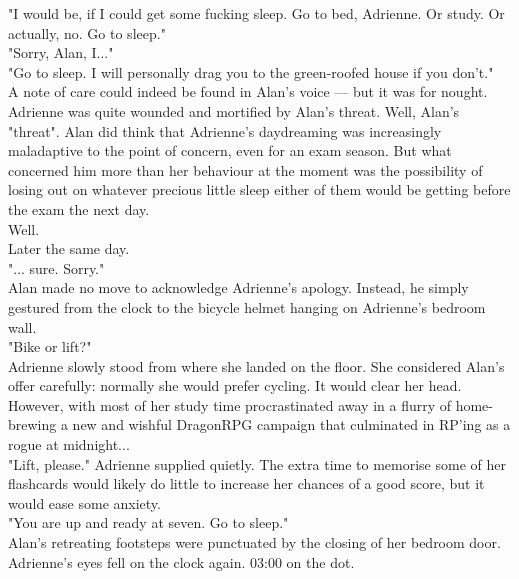 "I would be, if I could get some fucking sleep. Go to bed, Adrienne. Or study. Or actually, no. Go to sleep."\\

"Sorry, Alan, I..."\\

"Go to sleep. I will personally drag you to the green-roofed house if you don't."\\

A note of care could indeed be found in Alan's voice --- but it was for nought. Adrienne was quite wounded and mortified by Alan's threat.
Well, Alan's "threat". Alan did think that Adrienne's daydreaming was increasingly maladaptive to the point of concern, even for an exam season.
But what concerned him more than her behaviour at the moment was the possibility of losing out on whatever precious little sleep either of them would be getting before the exam the next day.\\

Well.\\

Later the same day.\\

"... sure. Sorry."\\

Alan made no move to acknowledge Adrienne's apology.
Instead, he simply gestured from the clock to the bicycle helmet hanging on Adrienne's bedroom wall.\\

"Bike or lift?"\\

Adrienne slowly stood from where she landed on the floor. 
She considered Alan's offer carefully: normally she would prefer cycling.
It would clear her head.
However, with most of her study time procrastinated away in a flurry of home-brewing a new and wishful DragonRPG campaign that culminated in RP'ing as a rogue at midnight...\\

"Lift, please." Adrienne supplied quietly. 
The extra time to memorise some of her flashcards would likely do little to increase her chances of a good score, but it would ease some anxiety.\\

"You are up and ready at seven. Go to sleep."\\

Alan's retreating footsteps were punctuated by the closing of her bedroom door.\\

Adrienne's eyes fell on the clock again. 03:00 on the dot. 
